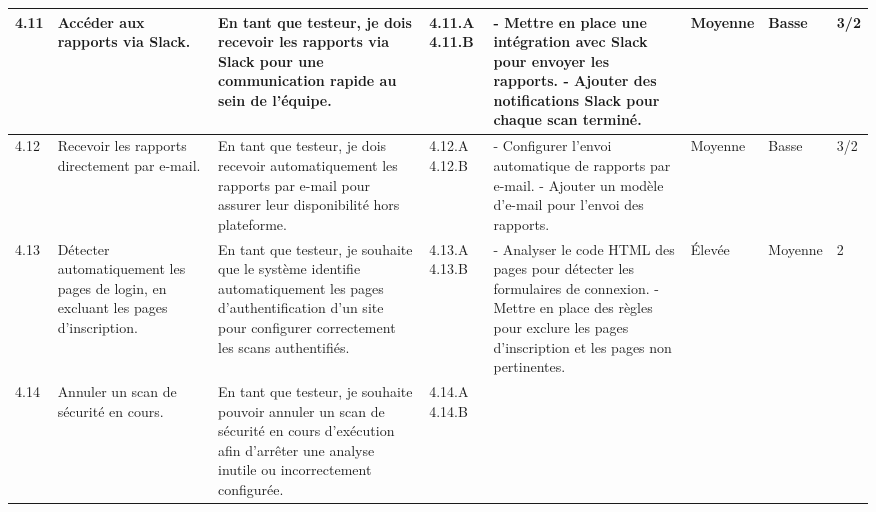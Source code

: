 \begin{landscape}
\begin{spacing}{0.94}
\begin{longtable}{|p{0.6cm}|p{2.6cm}|p{4.9cm}|p{0.97cm}|p{8.6cm}|p{0.35cm}|p{0.35cm}|p{1.6cm}|}
                \hline
                4.11 & Accéder aux rapports via Slack. 
                    & En tant que testeur, je dois recevoir les rapports via Slack pour une communication rapide au sein de l'équipe. 
                    & 4.11.A \newline\vspace{0.5cm} 4.11.B
                    & 
                    - Mettre en place une intégration avec Slack pour envoyer les rapports. \newline
                    - Ajouter des notifications Slack pour chaque scan terminé.
                    & Moyenne & Basse & 3/2 \\
                \hline
                4.12 & Recevoir les rapports directement par e-mail. 
                    & En tant que testeur, je dois recevoir automatiquement les rapports par e-mail pour assurer leur disponibilité hors plateforme. 
                    & 4.12.A \newline\vspace{0.5cm}4.12.B
                    & 
                    - Configurer l'envoi automatique de rapports par e-mail. \newline
                    - Ajouter un modèle d'e-mail pour l'envoi des rapports.
                    & Moyenne & Basse & 3/2 \\
                \hline
                4.13 & Détecter automatiquement les pages de login, en excluant les pages d’inscription. 
                    & En tant que testeur, je souhaite que le système identifie automatiquement les pages d’authentification d’un site pour configurer correctement les scans authentifiés. 
                    & 4.13.A \newline\vspace{0.5cm} 4.13.B
                    & 
                    - Analyser le code HTML des pages pour détecter les formulaires de connexion.\newline
                    - Mettre en place des règles pour exclure les pages d’inscription et les pages non pertinentes.
                    & Élevée & Moyenne & 2 \\
                \hline
                4.14 & Annuler un scan de sécurité en cours. 
                    & En tant que testeur, je souhaite pouvoir annuler un scan de sécurité en cours d'exécution afin d’arrêter une analyse inutile ou incorrectement configurée.
                    & 4.14.A \newline\vspace{0.5cm} 4.14.B

\end{longtable}
\end{spacing}
\end{landscape}
